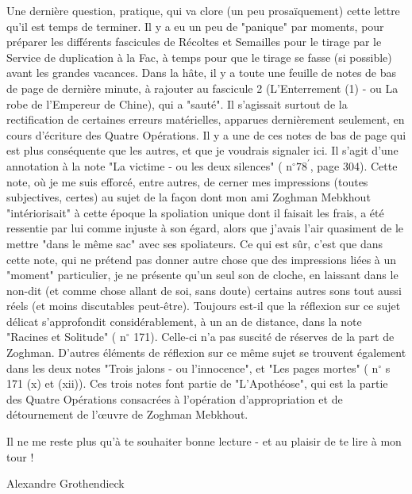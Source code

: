 Une dernière question, pratique, qui va clore (un peu prosaïquement) cette lettre qu'il est temps de terminer. Il y a eu un peu de "panique" par moments, pour préparer les différents fascicules de Récoltes et Semailles pour le tirage par le Service de duplication à la Fac, à temps pour que le tirage se fasse (si possible) avant les grandes vacances. Dans la hâte, il y a toute une feuille de notes de bas de page de dernière minute, à rajouter au fascicule 2 (L'Enterrement (1) - ou La robe de l'Empereur de Chine), qui a "sauté". Il s'agissait surtout de la rectification de certaines erreurs matérielles, apparues dernièrement seulement, en cours d'écriture des Quatre Opérations. Il y a une de ces notes de bas de page qui est plus conséquente que les autres, et que je voudrais signaler ici. Il s'agit d'une annotation à la note "La victime - ou les deux silences" ( $\mathrm{n}^{\circ} 78^{\prime}$, page 304). Cette note, où je me suis efforcé, entre autres, de cerner mes impressions (toutes subjectives, certes) au sujet de la façon dont mon ami Zoghman Mebkhout "intériorisait" à cette époque la spoliation unique dont il faisait les frais, a été ressentie par lui comme injuste à son égard, alors que j'avais l'air quasiment de le mettre "dans le même sac" avec ses spoliateurs. Ce qui est sûr, c'est que dans cette note, qui ne prétend pas donner autre chose que des impressions liées à un "moment" particulier, je ne présente qu'un seul son de cloche, en laissant dans le non-dit (et comme chose allant de soi, sans doute) certains autres sons tout aussi réels (et moins discutables peut-être). Toujours est-il que la réflexion sur ce sujet délicat s'approfondit considérablement, à un an de distance, dans la note "Racines et Solitude" ( $\mathrm{n}^{\circ}$ 171). Celle-ci n'a pas suscité de réserves de la part de Zoghman. D'autres éléments de réflexion sur ce même sujet se trouvent également dans les deux notes "Trois jalons - ou l'innocence", et "Les pages mortes" ( $\mathrm{n}^{\circ}$ s 171 (x) et (xii)). Ces trois notes font partie de "L'Apothéose", qui est la partie des Quatre Opérations consacrées à l'opération d'appropriation et de détournement de l'œuvre de Zoghman Mebkhout.

Il ne me reste plus qu'à te souhaiter bonne lecture - et au plaisir de te lire à mon tour !

\hfill Alexandre Grothendieck







